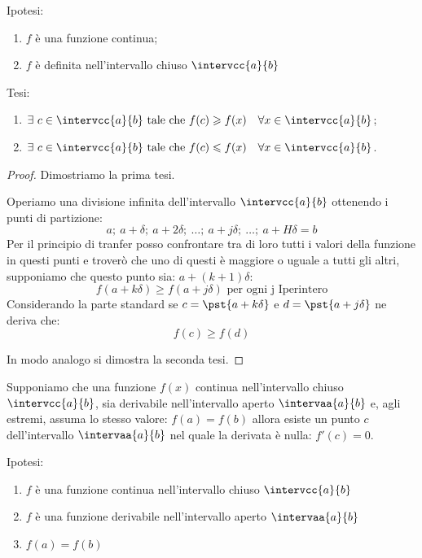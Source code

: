 \noindent Ipotesi:
\begin{enumerate}[nosep]
 \item \(f\) è una funzione continua;
 \item \(f\) è definita nell'intervallo chiuso \(\intervcc{a}{b}\)
\end{enumerate}

\noindent Tesi: 
\begin{enumerate}[nosep]
 \item \(\exists~c \in \intervcc{a}{b} \text{ tale che }
         f(c) \geqslant f(x) \quad \forall x \in \intervcc{a}{b}\);
 \item \(\exists~c \in \intervcc{a}{b} \text{ tale che }
         f(c) \leqslant f(x) \quad \forall x \in \intervcc{a}{b}\).
\end{enumerate}

\begin{proof}
Dimostriamo la prima tesi.

Operiamo una divisione infinita dell'intervallo \(\intervcc{a}{b}\)
ottenendo i punti di partizione: 
\[a;~a+\delta;~a+2\delta;~\dots;~a+j\delta;~\dots;~a+H\delta=b\]
Per il principio di tranfer posso confrontare tra di loro tutti i valori della 
funzione in questi punti e troverò che uno di questi è maggiore o uguale a 
tutti gli altri, supponiamo che questo punto sia: \(a+(k+1)\delta\):
\[f(a+k\delta) \geqslant f(a+j\delta) \text{ per ogni j Iperintero}\]
Considerando la parte standard 
se \(c=\pst{a+k\delta}\) e \(d=\pst{a+j\delta}\)
ne deriva che:
\[f(c) \geqslant f(d)\]

In modo analogo si dimostra la seconda tesi.
\end{proof}


\begin{teorema}
Supponiamo che una funzione \(f(x)\) continua nell'intervallo chiuso
\(\intervcc{a}{b}\),
sia derivabile nell'intervallo aperto
\(\intervaa{a}{b}\) 
e, agli estremi, assuma lo stesso valore: \(f(a) = f(b)\) allora
esiste un punto \(c\) dell'intervallo \(\intervaa{a}{b}\) nel quale 
la derivata è nulla: \(f'(c)=0\).
\end{teorema}

\noindent Ipotesi:
\begin{enumerate}[nosep]
 \item \(f\) è una funzione continua 
 nell'intervallo chiuso \(\intervcc{a}{b}\)
 \item \(f\) è una funzione derivabile 
 nell'intervallo aperto \(\intervaa{a}{b}\)
 \item \(f(a)=f(b)\)
\end{enumerate}

